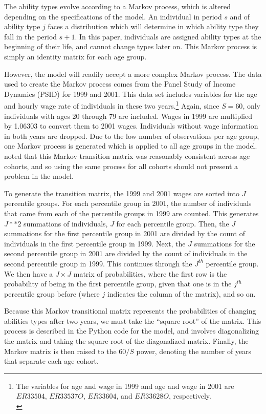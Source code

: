 \documentclass[letterpaper,12pt]{article}
\theoremstyle{definition}
\begin{document}
  The ability types evolve according to a Markov process, which is altered depending on the specifications of the model.  An individual in period $s$ and of ability type $j$ faces a distribution which will determine in which ability type they fall in the period $s+1$.  In this paper, individuals are assigned ability types at the beginning of their life, and cannot change types later on.  This Markov process is simply an identity matrix for each age group.  

  However, the model will readily accept a more complex Markov process.  The data used to create the Markov process comes from the Panel Study of Income Dynamics (PSID) for 1999 and 2001.  This data set includes variables for the age and hourly wage rate of individuals in these two years.\footnote{The variables for age and wage in 1999 and age and wage in 2001 are $ER33504$, $ER33537O$, $ER33604$, and $ER33628O$, respectively.\\ [-2pt]} Again, since $S=60$, only individuals with ages 20 through 79 are included.  Wages in 1999 are multiplied by 1.06303 to convert them to 2001 wages. Individuals without wage information in both years are dropped. Due to the low number of observations per age group, one Markov process is generated which is applied to all age groups in the model. \cite{Nishiyama:2003} noted that this Markov transition matrix was reasonably consistent across age cohorts, and so using the same process for all cohorts should not present a problem in the model.

  To generate the transition matrix, the 1999 and 2001 wages are sorted into $J$ percentile groups.  For each percentile group in 2001, the number of individuals that came from each of the percentile groups in 1999 are counted.  This generates $J ** 2$ summations of individuals, $J$ for each percentile group.  Then, the $J$ summations for the first percentile group in 2001 are divided by the count of individuals in the first percentile group in 1999.  Next, the $J$ summations for the second percentile group in 2001 are divided by the count of individuals in the second percentile group in 1999.  This continues through the $J^{th}$ percentile group.  We then have a $J \times J$ matrix of probabilities, where the first row is the probability of being in the first percentile group, given that one is in the $j^{th}$ percentile group before (where $j$ indicates the column of the matrix), and so on.

  Because this Markov transitional matrix represents the probabilities of changing abilities types after two years, we must take the ``square root'' of the matrix.  This process is described in the Python code for the model, and involves diagonalizing the matrix and taking the square root of the diagonalized matrix.  Finally, the Markov matrix is then raised to the $60/S$ power, denoting the number of years that separate each age cohort.
\end{document}
